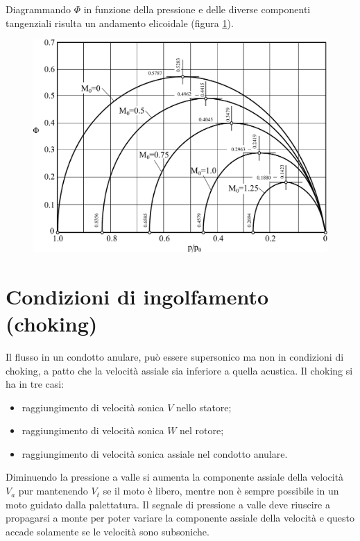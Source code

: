 Diagrammando $\Phi$ in funzione della pressione e delle diverse componenti tangenziali risulta un andamento elicoidale (figura \ref{fd:PortCondAn}).
\begin{figure}
\centering
  \includegraphics[width=.7\textwidth]{fig/PortCondAn.pdf}
\caption{}
\label{fd:PortCondAn}
\end{figure}
\section{Condizioni di ingolfamento (choking)}
Il flusso in un condotto anulare, può essere supersonico ma non in condizioni di choking, a patto che la velocità assiale sia inferiore a quella acustica. Il choking si ha in tre casi:
\begin{itemize}
	\item raggiungimento di velocità sonica $V$ nello statore;
	\item raggiungimento di velocità sonica $W$ nel rotore;
	\item raggiungimento di velocità sonica assiale nel condotto anulare.
\end{itemize}

Diminuendo la pressione a valle si aumenta la componente assiale della velocità $V_a$ pur mantenendo $V_t$ se il moto è libero, mentre non è sempre possibile in un moto guidato dalla palettatura. Il segnale di pressione a valle deve riuscire a propagarsi a monte per poter variare la componente assiale della velocità e questo accade solamente se le velocità sono subsoniche.

